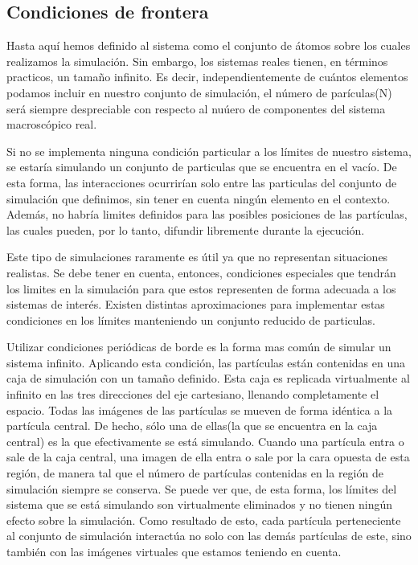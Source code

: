 \documentclass[a4paper,10pt]{report}
\begin{document}
\subsection{Condiciones de frontera}

Hasta aquí hemos definido al sistema como el conjunto de átomos sobre los cuales realizamos la simulación. 
Sin embargo, los sistemas reales tienen, en términos practicos, un tamaño infinito. 
Es decir, independientemente de cuántos elementos podamos incluir en nuestro conjunto de simulación, el número de parículas(N) será siempre despreciable con respecto al nuúero de componentes del sistema macroscópico real.

Si no se implementa ninguna condición particular a los límites de nuestro sistema, se estaría simulando un conjunto de particulas que se encuentra en el vacío. 
De esta forma, las interacciones ocurrirían solo entre las particulas del conjunto de simulación que definimos, sin tener en cuenta ningún elemento en el contexto.
Además, no habría limites definidos para las posibles posiciones de las partículas, las cuales pueden, por lo tanto, difundir libremente durante la ejecución.

Este tipo de simulaciones raramente es útil ya que no representan situaciones realistas. Se debe tener en cuenta, entonces, condiciones especiales que tendrán los limites en la simulación para que estos representen de forma adecuada a los sistemas de interés.
Existen distintas aproximaciones para implementar estas condiciones en los límites manteniendo un conjunto reducido de particulas. 

Utilizar condiciones periódicas de borde es la forma mas común de simular un sistema infinito. Aplicando esta condición, las partículas están contenidas en una caja de simulación con un tamaño definido. 
Esta caja es replicada virtualmente al infinito en las tres direcciones del eje cartesiano, llenando completamente el espacio.
Todas las imágenes de las partículas se mueven de forma idéntica a la partícula central. De hecho, sólo una de ellas(la que se encuentra en la caja central) es la que efectivamente se está simulando.
Cuando una partícula entra o sale de la caja central, una imagen de ella entra o sale por la cara opuesta de esta región, de manera tal que el número de partículas contenidas en la región de simulación siempre se conserva.
Se puede ver que, de esta forma, los límites del sistema que se está simulando son virtualmente eliminados y no tienen ningún efecto sobre la simulación.
Como resultado de esto, cada partícula perteneciente al conjunto de simulación interactúa no solo con las demás partículas de este, sino también con las imágenes virtuales que estamos teniendo en cuenta.
\end{document}
